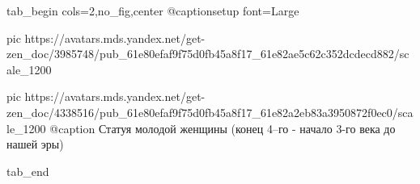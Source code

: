  
 
 
 
 


\ifcmt
  tab_begin cols=2,no_fig,center
		 @captionsetup font=Large

     pic https://avatars.mds.yandex.net/get-zen_doc/3985748/pub_61e80efaf9f75d0fb45a8f17_61e82ae5c62c352dcdecd882/scale_1200

		 pic https://avatars.mds.yandex.net/get-zen_doc/4338516/pub_61e80efaf9f75d0fb45a8f17_61e82a2eb83a3950872f0ec0/scale_1200
		 @caption Статуя молодой женщины (конец 4–го - начало 3-го века до нашей эры)

  tab_end
\fi
